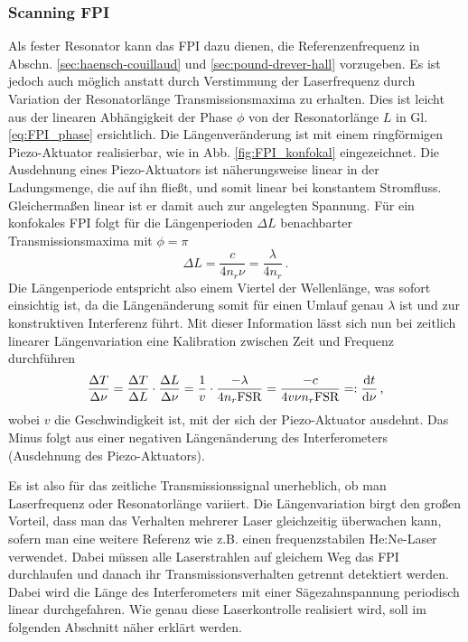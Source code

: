 \subsubsection{Scanning FPI}\label{subsubsec:scanning_FPI}
Als fester Resonator kann das FPI dazu dienen, die
Referenzenfrequenz in Abschn. \ref{sec:haensch-couillaud} und
\ref{sec:pound-drever-hall} vorzugeben. Es ist jedoch auch möglich anstatt durch
Verstimmung der Laserfrequenz durch Variation der Resonatorlänge
Transmissionsmaxima zu erhalten. Dies ist leicht aus der linearen Abhängigkeit
der Phase $\phi$ von der Resonatorlänge $L$ in Gl. \eqref{eq:FPI_phase}
ersichtlich. Die Längenveränderung ist mit einem ringförmigen Piezo-Aktuator
realisierbar, wie in Abb. \ref{fig:FPI_konfokal} eingezeichnet. Die Ausdehnung
eines Piezo-Aktuators ist näherungsweise linear in der Ladungsmenge, die auf ihn
fließt, und somit linear bei konstantem Stromfluss. Gleichermaßen linear ist er
damit auch zur angelegten Spannung. Für ein konfokales FPI folgt für die
Längenperioden $\Delta L$ benachbarter Transmissionsmaxima mit $\phi=\pi$
\begin{equation}\label{eq:FPI_laengenperiode}
	\Delta L=\frac{c}{4n_r\nu}=\frac{\lambda}{4n_r}\,.
\end{equation}
Die Längenperiode entspricht also einem Viertel der Wellenlänge, was sofort
einsichtig ist, da die Längenänderung somit für einen Umlauf genau $\lambda$ ist
und zur konstruktiven Interferenz führt. Mit dieser Information lässt sich nun
bei zeitlich linearer Längenvariation eine Kalibration zwischen Zeit und
Frequenz durchführen
\begin{equation}\label{eq:FPI_zeit-eichung}
	\frac{\Delta T}{\Delta\nu}=\frac{\Delta T}{\Delta L}\cdot\frac{\Delta
	L}{\Delta\nu}=\frac{1}{v}\cdot\frac{-\lambda}{4n_r\text{FSR}}=\frac{-c}{4v\nu
	n_r\text{FSR}}=:\frac{\mathrm{d} t}{\mathrm{d} \nu}\,,
\end{equation}
wobei $v$ die Geschwindigkeit ist, mit der sich der Piezo-Aktuator ausdehnt.
Das Minus folgt aus einer negativen Längenänderung des Interferometers
(Ausdehnung des Piezo-Aktuators).\par
Es ist also für das zeitliche Transmissionssignal unerheblich, ob man
Laserfrequenz oder Resonatorlänge variiert. Die Längenvariation birgt den großen
Vorteil, dass man das Verhalten mehrerer Laser gleichzeitig überwachen kann,
sofern man eine weitere Referenz wie z.B. einen frequenzstabilen He:Ne-Laser
verwendet.
Dabei müssen alle Laserstrahlen auf gleichem Weg das FPI durchlaufen und
danach ihr Transmissionsverhalten getrennt detektiert werden. Dabei wird
die Länge des Interferometers mit einer
Sägezahnspannung periodisch linear durchgefahren. Wie genau
diese Laserkontrolle realisiert wird, soll im folgenden Abschnitt näher erklärt werden.


